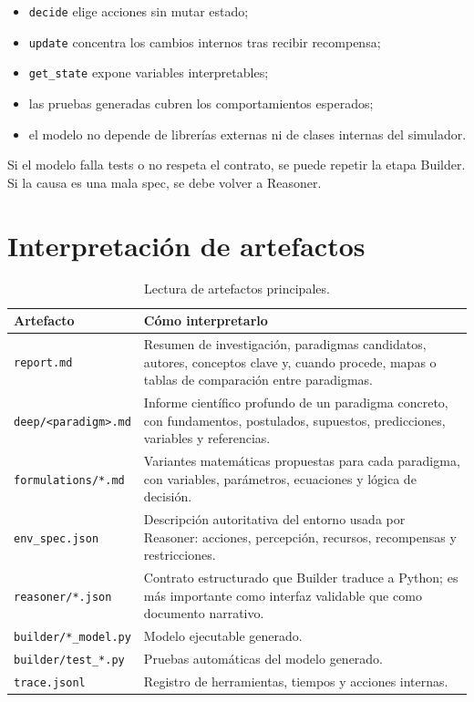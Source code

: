 \begin{itemize}
\item \texttt{decide} elige acciones sin mutar estado;
\item \texttt{update} concentra los cambios internos tras recibir recompensa;
\item \texttt{get\_state} expone variables interpretables;
\item las pruebas generadas cubren los comportamientos esperados;
\item el modelo no depende de librerías externas ni de clases internas del simulador.
\end{itemize}

Si el modelo falla tests o no respeta el contrato, se puede repetir la etapa
Builder. Si la causa es una mala spec, se debe volver a Reasoner.

\section{Interpretación de artefactos}

\begin{table}[H]
\begin{center}
\small
\begin{tabular}{|>{\raggedright\arraybackslash}p{4cm}|>{\raggedright\arraybackslash}p{8.2cm}|} \hline
\textbf{Artefacto} & \textbf{Cómo interpretarlo} \\ \hline
\texttt{report.md} & Resumen de investigación, paradigmas candidatos, autores, conceptos clave y, cuando procede, mapas o tablas de comparación entre paradigmas. \\ \hline
\texttt{deep/<paradigm>.md} & Informe científico profundo de un paradigma concreto, con fundamentos, postulados, supuestos, predicciones, variables y referencias. \\ \hline
\texttt{formulations/*.md} & Variantes matemáticas propuestas para cada paradigma, con variables, parámetros, ecuaciones y lógica de decisión. \\ \hline
\texttt{env\_spec.json} & Descripción autoritativa del entorno usada por Reasoner: acciones, percepción, recursos, recompensas y restricciones. \\ \hline
\texttt{reasoner/*.json} & Contrato estructurado que Builder traduce a Python; es más importante como interfaz validable que como documento narrativo. \\ \hline
\texttt{builder/*\_model.py} & Modelo ejecutable generado. \\ \hline
\texttt{builder/test\_*.py} & Pruebas automáticas del modelo generado. \\ \hline
\texttt{trace.jsonl} & Registro de herramientas, tiempos y acciones internas. \\ \hline
\end{tabular}
\caption{Lectura de artefactos principales.}
\end{center}
\end{table}

